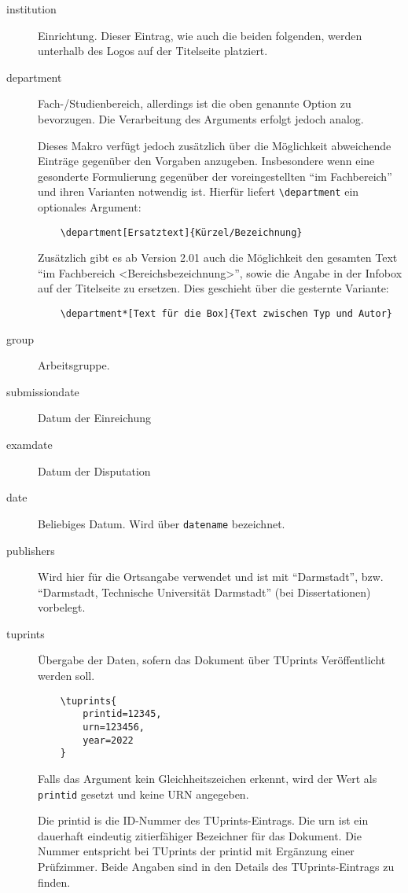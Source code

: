 \documentclass[
	german,%
	accentcolor=9c,%
	ruledheaders=section,%
	class=report,%
	thesis={type=bachelor},%
	fontsize=11pt,%
	parskip=half-,%
	custommargins=true,%
	marginpar=false,%
]{tudapub}
\newcommand*{\code}[1]{\texttt{#1}}
\begin{document}
\begin{description}
	\item[institution] Einrichtung. Dieser Eintrag, wie auch die beiden folgenden, werden unterhalb des Logos auf der Titelseite platziert.
	\item[department] Fach-/Studienbereich, allerdings ist die oben genannte Option zu bevorzugen. Die Verarbeitung des Arguments erfolgt jedoch analog.

	      Dieses Makro verfügt jedoch zusätzlich über die Möglichkeit abweichende Einträge gegenüber den Vorgaben anzugeben. Insbesondere wenn eine gesonderte Formulierung gegenüber der voreingestellten \enquote{im Fachbereich} und ihren Varianten notwendig ist. Hierfür liefert \code{\textbackslash{}department} ein optionales Argument:

\begin{verbatim}
    \department[Ersatztext]{Kürzel/Bezeichnung}
\end{verbatim}
	      Zusätzlich gibt es ab Version 2.01 auch die Möglichkeit den gesamten Text \enquote{im Fachbereich <Bereichsbezeichnung>}, sowie die Angabe in der Infobox auf der Titelseite zu ersetzen. Dies geschieht über die gesternte Variante:
\begin{verbatim}
    \department*[Text für die Box]{Text zwischen Typ und Autor}
\end{verbatim}
	\item[group] Arbeitsgruppe.
	\item[submissiondate] Datum der Einreichung
	\item[examdate] Datum der Disputation
	\item[date] Beliebiges Datum. Wird über \verb|datename| bezeichnet.
	\item[publishers] Wird hier für die Ortsangabe verwendet und ist mit \enquote{Darmstadt}, bzw. \enquote{Darmstadt, Technische Universität Darmstadt} (bei Dissertationen) vorbelegt.
	\item[tuprints] \label{page:tuprints}Übergabe der Daten, sofern das Dokument über TUprints Veröffentlicht werden soll.
\begin{verbatim}
    \tuprints{
        printid=12345,
        urn=123456,
        year=2022
    }
\end{verbatim}
	      Falls das Argument kein Gleichheitszeichen erkennt, wird der Wert als \code{printid} gesetzt und keine URN angegeben.

	      Die printid is die ID-Nummer des TUprints-Eintrags. Die urn ist ein dauerhaft eindeutig zitierfähiger Bezeichner für das Dokument. Die Nummer entspricht bei TUprints der printid mit Ergänzung einer Prüfzimmer. Beide Angaben sind in den Details des TUprints-Eintrags zu finden.


\end{description}
\end{document}
